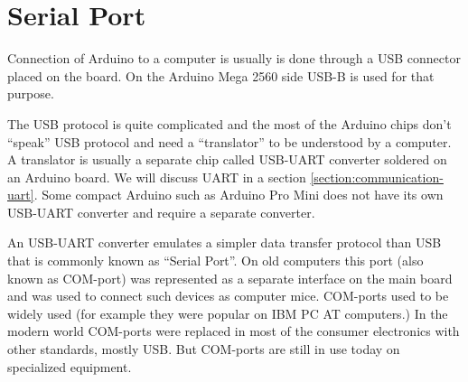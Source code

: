 \documentclass[../sparc.tex]{subfiles}
\begin{document}
\section{Serial Port}
\label{section:serial-port}

Connection of Arduino to a computer is usually is done through a USB connector
placed on the board.  On the Arduino Mega 2560 side USB-B is used for that
purpose.

The USB protocol is quite complicated and the most of the Arduino chips don't
``speak'' USB protocol and need a ``translator'' to be understood by a computer.
A translator is usually a separate chip called USB-UART converter soldered on an
Arduino board.  We will discuss UART in a section
\ref{section:communication-uart}.  Some compact Arduino such as Arduino Pro Mini
does not have its own USB-UART converter and require a separate converter.

An USB-UART converter emulates a simpler data transfer protocol than USB that is
commonly known as ``Serial Port''.  On old computers this port (also known as
COM-port) was represented as a separate interface on the main board and was used
to connect such devices as computer mice.  COM-ports used to be widely used (for
example they were popular on IBM PC AT computers.)  In the modern world
COM-ports were replaced in most of the consumer electronics with other
standards, mostly USB.  But COM-ports are still in use today on specialized
equipment.
\end{document}
